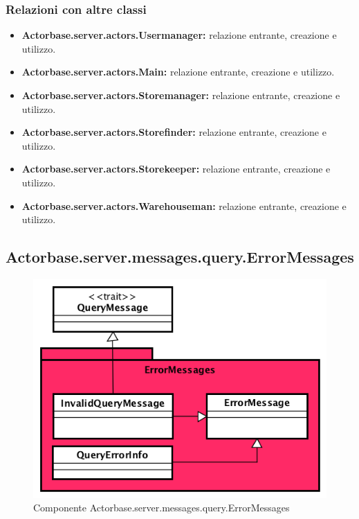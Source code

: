\documentclass[a4paper]{article}
\begin{document}
			\subsubsection{Relazioni con altre classi}
				\begin{itemize}
					\item \textbf{Actorbase.server.actors.Usermanager:} relazione entrante, creazione e utilizzo.
					\item \textbf{Actorbase.server.actors.Main:} relazione entrante, creazione e utilizzo.
					\item \textbf{Actorbase.server.actors.Storemanager:} relazione entrante, creazione e utilizzo.
					\item \textbf{Actorbase.server.actors.Storefinder:} relazione entrante, creazione e utilizzo.
					\item \textbf{Actorbase.server.actors.Storekeeper:} relazione entrante, creazione e utilizzo.
					\item \textbf{Actorbase.server.actors.Warehouseman:} relazione entrante, creazione e utilizzo.
				\end{itemize}
				
		\subsection{Actorbase.server.messages.query.ErrorMessages}
		
			\begin{figure}[H]
				\centering
				\includegraphics[width=\textwidth]{ST/Server/errorMessagesLevel}
				\caption{Componente Actorbase.server.messages.query.ErrorMessages}
			\end{figure}
			
\end{document}
